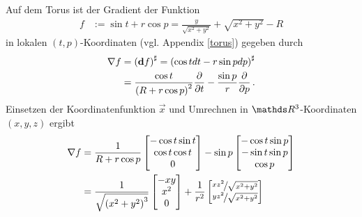     \begin{beispiel}[Torus]
      \label{bspGradTorus}
      Auf dem Torus ist der Gradient der Funktion
      \begin{align}
        f &:= \sin t + r\cos p = \frac{y}{\sqrt{x^{2}+y^{2}}} + \sqrt{x^{2}+y^{2}} - R
      \end{align}
      in lokalen \( \left( t,p \right) \)-Koordinaten (vgl. Appendix \ref{torus}) gegeben durch
      \begin{align}
        \nabla f &= \left( \mathbf{d} f \right)^{\sharp} = \left( \cos t dt - r \sin p dp \right)^{\sharp} \\
                 & = \frac{\cos t}{\left( R + r \cos p \right)^{2}} \frac{\partial}{\partial t}
                     - \frac{\sin p}{r} \frac{\partial}{\partial p} \,\text{.}
      \end{align}
      Einsetzen der Koordinatenfunktion \( \vec{x} \) und Umrechnen in \( \R^{3} \)-Koordinaten \( \left( x,y,z \right) \) ergibt
      \begin{align}
        \nabla f &= \frac{1}{R + r \cos p} \begin{bmatrix}
                                             - \cos t \sin t \\
                                             \cos t \cos t \\
                                             0
                                           \end{bmatrix}
                   -\sin p\begin{bmatrix}
                             - \cos t \sin p \\
                             - \sin t \sin p \\
                             \cos p
                          \end{bmatrix} \\
                &= \frac{1}{\sqrt{\left( x^{2}+y^{2} \right)^{3}}} 
                      \begin{bmatrix}
                        -xy \\ x^{2} \\ 0
                      \end{bmatrix}
                   + \frac{1}{r^{2}}
                      \begin{bmatrix}
                        \nicefrac{xz^{2}}{\sqrt{x^{2}+y^{2}}} \\
                        \nicefrac{yz^{2}}{\sqrt{x^{2}+y^{2}}} \\

\end{bmatrix}
\end{align}
\end{beispiel}
